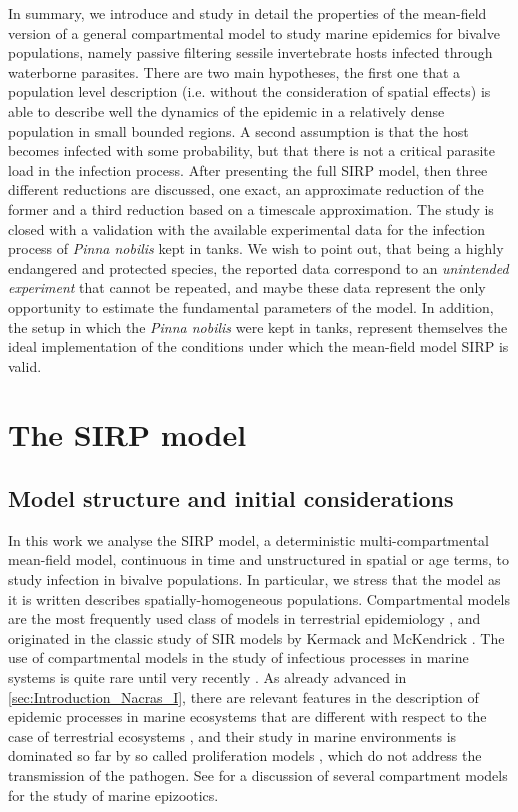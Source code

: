 In summary, we introduce and study in detail the properties of the
mean-field version of a general compartmental model to study marine epidemics
for bivalve populations, namely passive filtering sessile invertebrate hosts
infected through waterborne parasites.
There are two main hypotheses, the first one that a population level
description (i.e. without the consideration of spatial effects) is able to
describe well the dynamics of the epidemic in a relatively dense population in
small bounded regions.
A second assumption is that the host becomes infected with some
probability, but that there is not a critical parasite load in the infection
process.
After presenting the full SIRP model, then three different reductions are
discussed, one exact, an approximate reduction of the former and a third
reduction based on a timescale approximation. The study is closed with a
validation with the available experimental data for the infection process of
\textit{Pinna nobilis} kept in tanks. We wish to point out, that being a highly
endangered and protected species, the reported data correspond to an
\textit{unintended experiment} that cannot be repeated, and maybe these data
represent the only opportunity to estimate the fundamental parameters of the
model. In addition, the setup in which the \textit{Pinna nobilis} were kept in
tanks, represent themselves the ideal implementation of the conditions under
which the mean-field model SIRP is valid.

\section{The SIRP model} \label{sec:model_Nacras_I}

\subsection{Model structure and initial considerations} \label{subsec:modtruct}

In this work we analyse the SIRP model, a deterministic multi-compartmental
mean-field model,
continuous in time and unstructured in spatial or age terms,
to study infection in bivalve populations. In particular, we stress that
the model as it is written describes spatially-homogeneous populations.
Compartmental models are the
most frequently used class of models in terrestrial epidemiology
\cite{DiekmannBook}, and originated in the classic study of SIR models
by Kermack and McKendrick \cite{McKendrick}. The use of compartmental
models in the study of infectious processes in marine systems is quite
rare until very recently \cite{Harvell2004}. As already advanced in
\cref{sec:Introduction_Nacras_I}, there are relevant features in the
description of epidemic processes in
marine ecosystems that are different with respect to the case of
terrestrial ecosystems \cite{MCCALLUM_intro},
and their study in marine environments is dominated so far by so called
proliferation
models \cite{Powell2015}, which do not address the transmission of the
pathogen. See \cite{article_SIP} for a discussion of several compartment
models for the study of marine epizootics.

